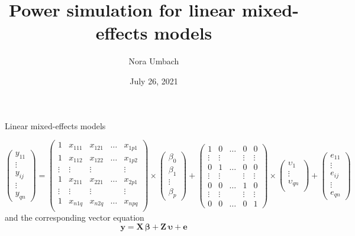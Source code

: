 \documentclass{beamer}
\title{Power simulation for linear mixed-effects models}
\author{Nora Umbach%
}
\date{July 26, 2021}
\newcommand{\mat}[1]{\mathbf{#1}}
\newcommand{\gmat}[1]{\boldsymbol{#1}}
\begin{document}
\begin{frame}
\thispagestyle{empty}
\titlepage
\end{frame}

\begin{frame}{Linear mixed-effects models}

{\tiny
\[
  \begin{pmatrix}
    y_{11}\\
    \vdots\\
    y_{ij}\\
    \vdots\\
    y_{qn}
  \end{pmatrix}
  =
  \begin{pmatrix}
    1 & x_{111} & x_{121} & \dots & x_{1p1}\\
    1 & x_{112} & x_{122} & \dots & x_{1p2}\\
    \vdots & \vdots & \vdots && \vdots \\
    1 & x_{211} & x_{221} & \dots & x_{2p1}\\
    \vdots & \vdots & \vdots && \vdots \\
    1 & x_{n1q} & x_{n2q} & \dots & x_{npq}\\
  \end{pmatrix}
\times
  \begin{pmatrix}
    \beta_0\\
    \beta_1\\
    \vdots\\
    \beta_p
  \end{pmatrix}
+
  \begin{pmatrix}
    1 & 0 & \dots & 0 & 0\\
    \vdots & \vdots && \vdots & \vdots \\
    0 & 1 & \dots & 0 & 0\\
    \vdots & \vdots && \vdots & \vdots \\
    0 & 0 & \dots & 1 & 0\\
    \vdots & \vdots && \vdots & \vdots \\
    0 & 0 & \dots & 0 & 1
  \end{pmatrix}
\times
  \begin{pmatrix}
    \upsilon_1\\
    \vdots\\
    \upsilon_{qn}\\
  \end{pmatrix}
+
  \begin{pmatrix}
    e_{11}\\
    \vdots\\
    e_{ij}\\
    \vdots\\
    e_{qn}
  \end{pmatrix}
\]
}
and the corresponding vector equation
\[
  \mat{y} = \mat{X} \, \gmat{\beta} + \mat{Z} \,\gmat{\upsilon} + \mat{e}
\]
\
\end{frame}
\end{document}
